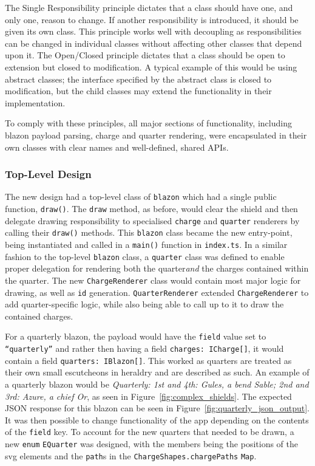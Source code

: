 \documentclass[nobib, a4paper, twoside, justified]{tufte-book}
\makeatletter
\newcommand{\svg}{\gls{svg}\@\xspace}
\newcommand{\charge}{\gls{charge}\@\xspace}
\newcommand{\charges}{\glspl{charge}\@\xspace}
\newcommand{\quarter}{\gls{quarter}\@\xspace}
\newcommand{\quarters}{\glspl{quarter}\@\xspace}
\newcommand{\blazon}{\gls{blazon}\@\xspace}
\newcommand{\ublazon}{\Gls{blazon}\@\xspace}
\newcommand{\payload}{\gls{payload}\@\xspace}
\makeatother
\begin{document}
The Single Responsibility principle dictates that a class should have one, and only one, reason to
change. If another responsibility is introduced, it should be given its own class. This principle
works well with decoupling as responsibilities can be changed in individual classes without
affecting other classes that depend upon it. The Open/Closed principle dictates that a class should
be open to extension but closed to modification. A typical example of this would be using abstract
classes; the interface specified by the abstract class is closed to modification, but the child
classes may extend the functionality in their implementation.

To comply with these principles, all major sections of functionality, including \blazon
\payload parsing, \charge and \quarter rendering, were encapsulated in their own classes with clear
names and well-defined, shared APIs.

\subsubsection{Top-Level Design}%
\label{ssub:top_level_design}

The new design had a top-level class of \texttt{\ublazon} which had a single public function,
\texttt{draw()}. The \texttt{draw} method, as before, would clear the shield and then delegate
drawing responsibility to specialised \texttt{\charge} and \texttt{\quarter} renderers by calling
their \texttt{draw()} methods. This \texttt{\ublazon} class became the new entry-point, being
instantiated and called in a \texttt{main()} function in \texttt{index.ts}. In a similar fashion to
the top-level \texttt{\ublazon} class, a \texttt{\Gls{quarter}} class was defined to enable proper
delegation for rendering both the \quarter \textit{and} the \charges contained within the quarter.
The new \texttt{ChargeRenderer} class would contain most major logic for drawing, as well as
\texttt{id} generation. \texttt{QuarterRenderer} extended \texttt{ChargeRenderer} to add
\quarter-specific logic, while also being able to call up to it to draw the contained \charges.

For a quarterly \blazon, the \payload would have the \texttt{\gls{field}} value set to
\texttt{``quarterly''} and rather then having a field \texttt{charges: ICharge[]}, it would contain
a field \texttt{quarters: IBlazon[]}. This worked as \quarters are treated as their own small
\glspl{escutcheon} in heraldry and are described as such. An example of a quarterly \blazon would
be \textit{Quarterly: 1st and 4th: Gules, a bend Sable; 2nd and 3rd: Azure, a chief Or}, as seen in
Figure~\ref{fig:complex_shields}. The expected JSON response for this \blazon can be seen in
Figure~\ref{fig:quarterly_json_output}. It was then possible to change functionality of the app
depending on the contents of the \texttt{field} key. To account for the new quarters that needed to
be drawn, a new \texttt{enum} \texttt{EQuarter} was designed, with the members being the positions
of the \svg elements and the \texttt{path}s in the \texttt{ChargeShapes.chargePaths} \texttt{Map}.
\end{document}
